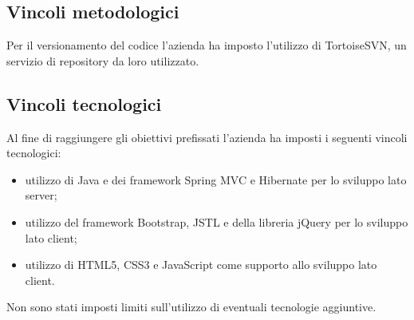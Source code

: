 \subsection{Vincoli metodologici}
Per il versionamento del codice l'azienda ha imposto l'utilizzo di TortoiseSVN, un servizio di repository da loro utilizzato. 

\subsection{Vincoli tecnologici}
Al fine di raggiungere gli obiettivi prefissati l'azienda ha imposti i seguenti vincoli tecnologici:
\begin{itemize}
\item utilizzo di Java e dei framework Spring MVC e Hibernate per lo sviluppo lato server;
\item utilizzo del framework Bootstrap, JSTL e della libreria jQuery per lo sviluppo lato client;
\item utilizzo di HTML5, CSS3 e JavaScript come supporto allo sviluppo lato client.
\end{itemize}
Non sono stati imposti limiti sull’utilizzo di eventuali tecnologie aggiuntive.
